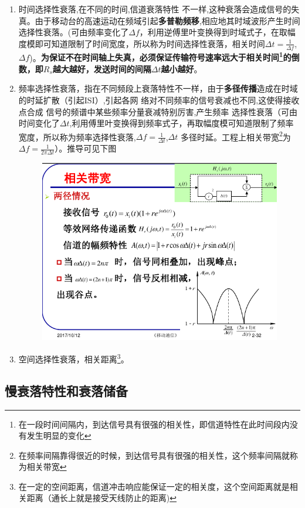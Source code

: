 \begin{enumerate}
	\item 时间选择性衰落,在不同的时间,信道衰落特性
	不一样,这种衰落会造成信号的失真。由于移动台的高速运动在频域引起\textbf{多普勒频移},相应地其时域波形产生时间选择性衰落。(可由频率变化了$\Delta f$，利用逆傅里叶变换得到时域式子，在取幅度模即可知道限制了时间宽度，所以称为时间选择性衰落，相关时间$\Delta t = \frac{1}{\Delta f}$,$\Delta f${\color{red}{基带信号带宽})}。\textbf{为保证不在时间轴上失真，必须保证传输符号速率远大于相关时间\footnote{在一段时间间隔内，到达信号具有很强的相关性，即信道特性在此时间段内没有发生明显的变化}的倒数，即$R_s$越大越好，发送时间的间隔$\Delta t$越小越好}。
	\item 频率选择性衰落，指在不同频段上衰落特性不一样，由于\textbf{多径传播}造成在时域的时延扩散（引起ISI）,引起各网
	络对不同频率的信号衰减也不同,这使得接收点合成
	信号的频谱中某些频率分量衰减特别厉害,产生频率
	选择性衰落（可由时间变化了$\Delta t$,利用傅里叶变换得到频率式子，再取幅度模可知道限制了频率宽度，所以称为频率选择性衰落,$\Delta f = \frac{1}{\Delta t}$,$\Delta t$ 多径时延。工程上相关带宽\footnote{在频率间隔靠得很近的时候，到达信号具有很强的相关性，这个频率间隔就称为相关带宽}为$\Delta f = \frac{1}{2\pi \Delta t}$）。推导可见下图
	{
		\begin{figure}[h!]
			\centering
			\includegraphics[width=0.7\linewidth]{figures/相关带宽退到.png}
			\caption{}
			\label{fig:}
		\end{figure}
		
}
	\item 空间选择性衰落，相关距离\footnote{在一定的空间距离，信道冲击响应能保证一定的相关度，这个空间距离就是相关距离（通长上就是接受天线防止的距离)}。
\end{enumerate}
\subsection{ 慢衰落特性和衰落储备
}
